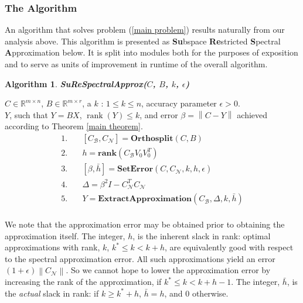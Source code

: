 \documentclass[11pt]{article}
\newcommand{\rank}{\operatorname{rank}}
\newtheorem{alg}{Algorithm}
\def\reals{\mathbb{R}}
\newcommand{\norm}[1]{\left\|#1\right\|}
\newcommand{\B}{\mathcal{B}}
\newcommand{\N}{\mathcal{N}}
\begin{document}
\subsubsection{The Algorithm}
An algorithm that solves problem (\ref{main problem}) results naturally from our analysis above. This algorithm is presented as \textbf{Su}bspace \textbf{Re}stricted \textbf{S}pectral \textbf{A}pproximation below. It is split into modules both for the purposes of exposition and to serve as units of improvement in runtime of the overall algorithm.
\begin{framed}
\begin{alg}\label{alg:outline}
{\bf SuReSpectralApprox($C$, $B$, $k$, $\epsilon$) }
\end{alg}
 $C \in \reals^{m \times n}$, $B \in \reals^{m \times r}$, a $k$ : $1 \leq k \leq n$, accuracy parameter $\epsilon > 0$.\\
 $Y$, such that $Y=BX$, $\rank(Y) \leq k$, and error $\beta = \norm{C - Y}$ achieved according to Theorem \ref{main theorem}.
%
\begin{align*}
1. \quad& [C_{\B}, C_{\N}] = \textbf{Orthosplit}(C, B) \\
2. \quad& h = \textbf{rank}(C_{\B} V_0 V_0 ^T) \\
3. \quad& [\beta,\bar h] = \textbf{SetError}(C, C_{\N}, k, h, \epsilon) \\
4. \quad& \Delta = \beta^2 I - C_{\N} ^T C_{\N} \\
5. \quad& Y = \textbf{ExtractApproximation}(C_{\B}, \Delta, k, \bar h) \\
\end{align*}
%
\end{framed}
We note that the approximation error may be obtained prior to obtaining the approximation itself. The integer, $h$, is the inherent slack in rank: optimal approximations with rank, $k$, $k^* \leq k < k+ h$, are equivalently good with respect to the spectral approximation error. All such approximations yield an error $(1+\epsilon) \norm{C_{\N}}$. So we cannot hope to lower the approximation error by increasing the rank of the approximation, if $k^* \leq k < k + h - 1$. The integer, $\bar{h}$, is the \emph{actual} slack in rank: if $k \geq k^* + h$, $\bar{h} = h$, and 0 otherwise.
\end{document}
